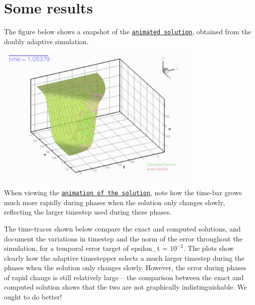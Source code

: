  

\hypertarget{index_reslt}{}\section{Some results}\label{index_reslt}
The figure below shows a snapshot of the \href{../figures/step_soln.avi}{\tt animated solution}, obtained from the doubly adaptive simulation.

 
\begin{DoxyImage}
\includegraphics[width=0.75\textwidth]{step_soln}
\end{DoxyImage}


When viewing the \href{../figures/step_soln.avi}{\tt animation of the solution}, note how the time-\/bar grows much more rapidly during phases when the solution only changes slowly, reflecting the larger timestep used during these phases.

The time-\/traces shown below compare the exact and computed solutions, and document the variations in timestep and the norm of the error throughout the simulation, for a temporal error target of {\ttfamily epsilon\+\_\+t} = $ 10^{-2}. $ The plots show clearly how the adaptive timestepper selects a much larger timestep during the phases when the solution only changes slowly. However, the error during phases of rapid change is still relatively large -- the comparison between the exact and computed solution shows that the two are not graphically indistinguishable. We ought to do better!


